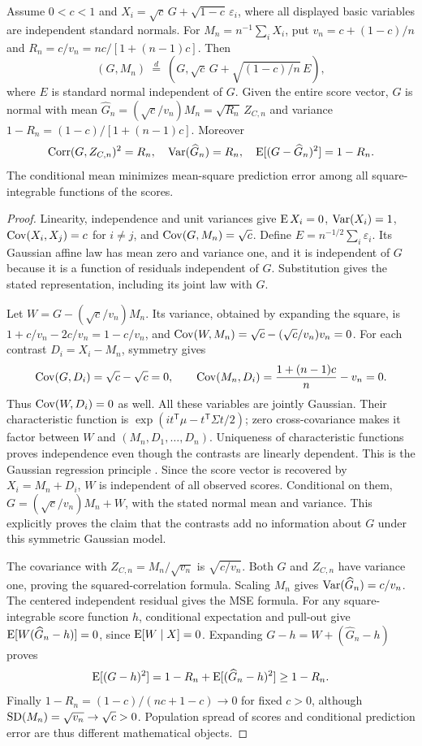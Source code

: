 \begin{proposition}
\label{hfpr:factor}
Assume \(0<c<1\) and
\(X_i=\sqrt c\,G+\sqrt{1-c}\,\varepsilon_i\), where all displayed
basic variables are independent standard normals. For
\(M_n=n^{-1}\sum_iX_i\), put \(v_n=c+(1-c)/n\) and
\(R_n=c/v_n=nc/[1+(n-1)c]\). Then
\[
 (G,M_n)\ \stackrel d=\
 \left(G,\sqrt c\,G+\sqrt{(1-c)/n}\,E\right),
\]
where \(E\) is standard normal independent of \(G\). Given the entire
score vector, \(G\) is normal with mean
\(\widehat G_n=(\sqrt c/v_n)M_n=\sqrt{R_n}\,Z_{C,n}\) and variance
\(1-R_n=(1-c)/[1+(n-1)c]\). Moreover
\[
 \operatorname{Corr}(G,Z_{C,n})^2=R_n,\quad
 \operatorname{Var}(\widehat G_n)=R_n,\quad
 \operatorname{E}[(G-\widehat G_n)^2]=1-R_n.
\]
The conditional mean minimizes mean-square prediction error among all
square-integrable functions of the scores.
\end{proposition}
\begin{proof}
Linearity, independence and unit variances give \(\operatorname{E} X_i=0\),
\(\operatorname{Var}(X_i)=1\), \(\operatorname{Cov}(X_i,X_j)=c\) for \(i\ne j\), and
\(\operatorname{Cov}(G,M_n)=\sqrt c\). Define
\(E=n^{-1/2}\sum_i\varepsilon_i\). Its Gaussian affine law has mean
zero and variance one, and it is independent of \(G\) because it is a
function of residuals independent of \(G\). Substitution gives the
stated representation, including its joint law with \(G\).

Let \(W=G-(\sqrt c/v_n)M_n\). Its variance, obtained by expanding
the square, is \(1+c/v_n-2c/v_n=1-c/v_n\), and
\(\operatorname{Cov}(W,M_n)=\sqrt c-(\sqrt c/v_n)v_n=0\). For each contrast
\(D_i=X_i-M_n\), symmetry gives
\[
 \operatorname{Cov}(G,D_i)=\sqrt c-\sqrt c=0,\qquad
 \operatorname{Cov}(M_n,D_i)=\frac{1+(n-1)c}{n}-v_n=0.
\]
Thus \(\operatorname{Cov}(W,D_i)=0\) as well. All these variables are jointly
Gaussian. Their characteristic function is
\(\exp(it^{\mathsf T}\mu-t^{\mathsf T}\Sigma t/2)\); zero
cross-covariance makes it factor between \(W\) and \((M_n,D_1,\ldots,D_n)\).
Uniqueness of characteristic functions proves independence even though
the contrasts are linearly dependent. This is the Gaussian regression
principle \citep[Theorems 3.3.2 and 3.5.1--3.5.2]{gallager2013}.
Since the score vector is recovered by \(X_i=M_n+D_i\), \(W\) is
independent of all observed scores. Conditional on them,
\(G=(\sqrt c/v_n)M_n+W\), with the stated normal mean and variance.
This explicitly proves the claim that the contrasts add no information
about \(G\) under this symmetric Gaussian model.

The covariance with \(Z_{C,n}=M_n/\sqrt{v_n}\) is
\(\sqrt{c/v_n}\). Both \(G\) and \(Z_{C,n}\) have variance one,
proving the squared-correlation formula. Scaling \(M_n\) gives
\(\operatorname{Var}(\widehat G_n)=c/v_n\). The centered independent residual gives
the MSE formula. For any square-integrable score function \(h\),
conditional expectation and pull-out give
\(\operatorname{E}[W(\widehat G_n-h)]=0\), since \(\operatorname{E}[W\mid X]=0\).
Expanding \(G-h=W+(\widehat G_n-h)\) proves
\[
 \operatorname{E}[(G-h)^2]=1-R_n+\operatorname{E}[(\widehat G_n-h)^2]\geq1-R_n.
\]
Finally \(1-R_n=(1-c)/(nc+1-c)\to0\) for fixed \(c>0\), although
\(\operatorname{SD}(M_n)=\sqrt{v_n}\to\sqrt c>0\). Population spread of scores
and conditional prediction error are thus different mathematical objects.
\end{proof}

